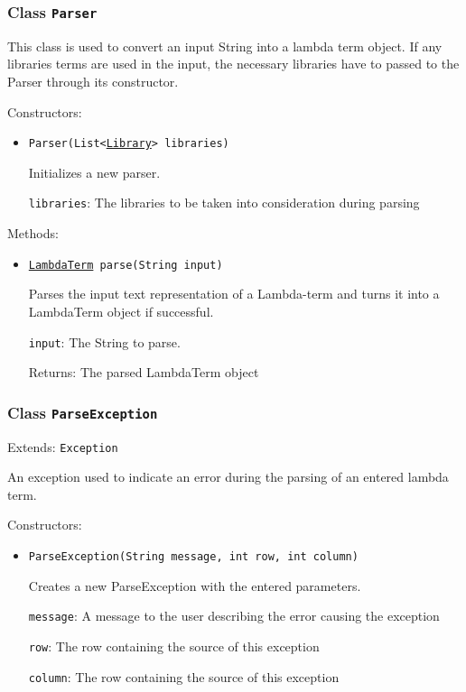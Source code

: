 \subsubsection{Class \texttt{Parser}}
\label{type:edu.kit.wavelength.client.model.term.parsing.Parser}
This class is used to convert an input String into a lambda term object.
 If any libraries terms are used in the input, the necessary libraries have to passed to the Parser through its constructor.

Constructors:
\begin{itemize}
\item \texttt{Parser(List<\hyperref[type:edu.kit.wavelength.client.model.library.Library]{Library}> libraries)}

Initializes a new parser.

\texttt{libraries}: The libraries to be taken into consideration during parsing

\end{itemize}

Methods:
\begin{itemize}
\item \texttt{\hyperref[type:edu.kit.wavelength.client.model.term.LambdaTerm]{LambdaTerm} parse(String input)}

Parses the input text representation of a Lambda-term and turns it into a LambdaTerm object if successful.

\texttt{input}: The String to parse.

Returns: The parsed LambdaTerm object

\end{itemize}

\subsubsection{Class \texttt{ParseException}}
\label{type:edu.kit.wavelength.client.model.term.parsing.ParseException}
Extends: \texttt{Exception}

An exception used to indicate an error during the parsing of an entered lambda term.

Constructors:
\begin{itemize}
\item \texttt{ParseException(String message, int row, int column)}

Creates a new ParseException with the entered parameters.

\texttt{message}: A message to the user describing the error causing the exception

\texttt{row}: The row containing the source of this exception

\texttt{column}: The row containing the source of this exception

\end{itemize}

